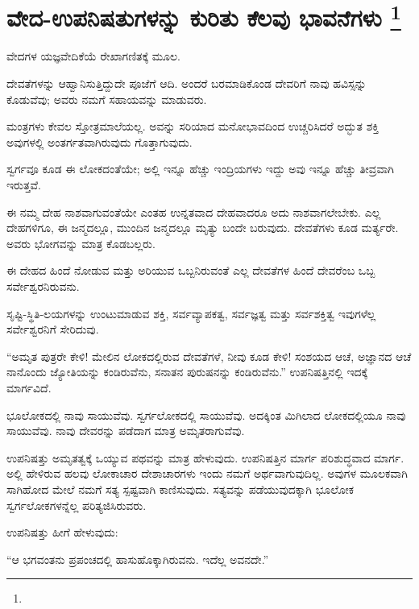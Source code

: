 
\vspace{-0.6cm}

\chapter[ವೇದ-ಉಪನಿಷತುಗಳನ್ನು ಕುರಿತು ಕೆಲವು ಭಾವನೆಗಳು ]{ವೇದ-ಉಪನಿಷತುಗಳನ್ನು ಕುರಿತು ಕೆಲವು ಭಾವನೆಗಳು \protect\footnote{}}

ವೇದಗಳ ಯಜ್ಞವೇದಿಕೆಯೆ ರೇಖಾಗಣಿತಕ್ಕೆ  ಮೂಲ.

ದೇವತೆಗಳನ್ನು ಆಹ್ವಾನಿಸುತ್ತಿದ್ದುದೇ ಪೂಜೆಗೆ ಆದಿ. ಅಂದರೆ ಬರಮಾಡಿಕೊಂಡ ದೇವರಿಗೆ ನಾವು ಹವಿಸ್ಸನ್ನು ಕೊಡುವೆವು; ಅವರು ನಮಗೆ ಸಹಾಯವನ್ನು ಮಾಡುವರು.

ಮಂತ್ರಗಳು ಕೇವಲ ಸ್ತೋತ್ರಮಾಲೆಯಲ್ಲ. ಅವನ್ನು ಸರಿಯಾದ ಮನೋಭಾವದಿಂದ ಉಚ್ಚರಿಸಿದರೆ ಅದ್ಭುತ ಶಕ್ತಿ ಅವುಗಳಲ್ಲಿ ಅಂತರ್ಗತವಾಗಿರುವುದು ಗೊತ್ತಾಗುವುದು.

ಸ್ವರ್ಗವೂ ಕೂಡ ಈ ಲೋಕದಂತೆಯೇ; ಅಲ್ಲಿ ಇನ್ನೂ ಹೆಚ್ಚು ಇಂದ್ರಿಯಗಳು ಇದ್ದು ಅವು ಇನ್ನೂ ಹೆಚ್ಚು ತೀವ್ರವಾಗಿ ಇರುತ್ತವೆ.

ಈ ನಮ್ಮ ದೇಹ ನಾಶವಾಗುವಂತೆಯೇ ಎಂತಹ ಉನ್ನತವಾದ ದೇಹವಾದರೂ ಅದು ನಾಶವಾಗಲೇಬೇಕು. ಎಲ್ಲ ದೇಹಗಳಿಗೂ, ಈ ಜನ್ಮದಲ್ಲೂ, ಮುಂದಿನ ಜನ್ಮದಲ್ಲೂ ಮೃತ್ಯು ಬಂದೇ ಬರುವುದು. ದೇವತೆಗಳು ಕೂಡ ಮರ್ತ್ಯರೇ. ಅವರು ಭೋಗವನ್ನು ಮಾತ್ರ ಕೊಡಬಲ್ಲರು.

ಈ ದೇಹದ ಹಿಂದೆ ನೋಡುವ ಮತ್ತು ಅರಿಯುವ ಒಬ್ಬನಿರುವಂತೆ ಎಲ್ಲ ದೇವತೆಗಳ ಹಿಂದೆ ದೇವರೆಂಬ ಒಬ್ಬ ಸರ್ವೇಶ್ವರನಿರುವನು.

ಸೃಷ್ಟಿ-ಸ್ಥಿತಿ-ಲಯಗಳನ್ನು ಉಂಟುಮಾಡುವ ಶಕ್ತಿ, ಸರ್ವವ್ಯಾಪಕತ್ವ, ಸರ್ವಜ್ಞತ್ವ ಮತ್ತು ಸರ್ವಶಕ್ತಿತ್ವ ಇವುಗಳೆಲ್ಲ ಸರ್ವೇಶ್ವರನಿಗೆ ಸೇರಿದುವು.

\vskip 5pt

“ಅಮೃತ ಪುತ್ರರೇ ಕೇಳಿ! ಮೇಲಿನ ಲೋಕದಲ್ಲಿರುವ ದೇವತೆಗಳೆ, ನೀವು ಕೂಡ ಕೇಳಿ! ಸಂಶಯದ ಆಚೆ, ಅಜ್ಞಾನದ ಆಚೆ ನಾನೊಂದು ಜ್ಯೋತಿಯನ್ನು ಕಂಡಿರುವೆನು, ಸನಾತನ ಪುರುಷನನ್ನು ಕಂಡಿರುವೆನು.” ಉಪನಿಷತ್ತಿನಲ್ಲಿ ಇದಕ್ಕೆ ಮಾರ್ಗವಿದೆ.

\vskip 5pt

ಭೂಲೋಕದಲ್ಲಿ ನಾವು ಸಾಯುವೆವು. ಸ್ವರ್ಗಲೋಕದಲ್ಲಿ ಸಾಯುವೆವು. ಅದಕ್ಕಿಂತ ಮಿಗಿಲಾದ ಲೋಕದಲ್ಲಿಯೂ ನಾವು ಸಾಯುವೆವು. ನಾವು ದೇವರನ್ನು ಪಡೆದಾಗ ಮಾತ್ರ ಅಮೃತರಾಗುವೆವು.

\vskip 5pt

ಉಪನಿಷತ್ತು ಅಮೃತತ್ವಕ್ಕೆ ಒಯ್ಯುವ ಪಥವನ್ನು ಮಾತ್ರ ಹೇಳುವುದು. ಉಪನಿಷತ್ತಿನ ಮಾರ್ಗ ಪರಿಶುದ್ಧವಾದ ಮಾರ್ಗ. ಅಲ್ಲಿ ಹೇಳಿರುವ ಹಲವು ಲೋಕಾಚಾರ ದೇಶಾಚಾರಗಳು ಇಂದು ನಮಗೆ ಅರ್ಥವಾಗುವುದಿಲ್ಲ. ಅವುಗಳ ಮೂಲಕವಾಗಿ ಸಾಗಿಹೋದ ಮೇಲೆ ನಮಗೆ ಸತ್ಯ ಸ್ಪಷ್ಟವಾಗಿ ಕಾಣಿಸುವುದು. ಸತ್ಯವನ್ನು ಪಡೆಯುವುದಕ್ಕಾಗಿ ಭೂಲೋಕ ಸ್ವರ್ಗಲೋಕಗಳನ್ನೆಲ್ಲ ಪರಿತ್ಯಜಿಸಿರುವರು.

\vskip 5pt

ಉಪನಿಷತ್ತು ಹೀಗೆ ಹೇಳುವುದು:

“ಆ ಭಗವಂತನು ಪ್ರಪಂಚದಲ್ಲಿ ಹಾಸುಹೊಕ್ಕಾಗಿರುವನು. ಇದೆಲ್ಲ ಅವನದೇ.”

